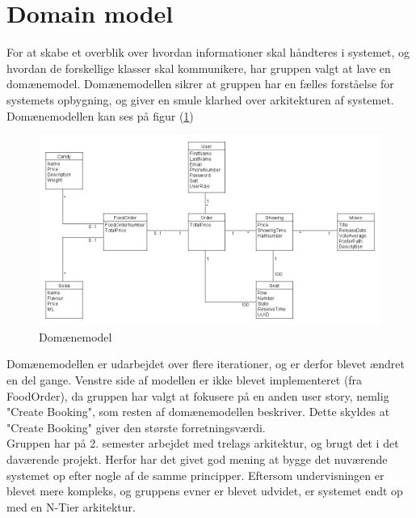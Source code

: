 ﻿\section{Domain model}
For at skabe et overblik over hvordan informationer skal håndteres i systemet,
og hvordan de forskellige klasser skal kommunikere, har gruppen valgt at lave en domænemodel.
Domænemodellen sikrer at gruppen har en fælles forståelse for systemets opbygning,
og giver en smule klarhed over arkitekturen af systemet.\\

Domænemodellen kan ses på figur (\ref{fig:domain})

\begin{figure}[H]
    \centering
    \includegraphics[width=1\textwidth]{figures/Domainmodel.png}
    \caption{Domænemodel}
    \label{fig:domain}
\end{figure}

Domænemodellen er udarbejdet over flere iterationer, og er derfor blevet ændret en del gange.
Venstre side af modellen er ikke blevet implementeret (fra FoodOrder), da gruppen har valgt at fokusere på
en anden user story, nemlig "Create Booking", som resten af domænemodellen beskriver. Dette skyldes at "Create Booking"
giver den største forretningsværdi. \\

Gruppen har på 2. semester arbejdet med trelags arkitektur, og brugt det i det daværende projekt.
Herfor har det givet god mening at bygge det nuværende systemet op efter nogle af de samme principper.
Eftersom undervisningen er blevet mere kompleks, og gruppens evner er blevet udvidet, er systemet endt op med en
N-Tier arkitektur.\\